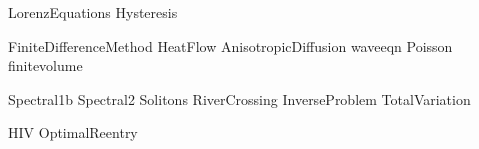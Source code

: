 \documentclass[nociteref]{SIAM-GH-book}
\begin{document}
{LorenzEquations}
{Hysteresis}

{FiniteDifferenceMethod}
{HeatFlow}
{AnisotropicDiffusion}
{waveeqn}
{Poisson}
{finitevolume}


{Spectral1b}
{Spectral2}
{Solitons}
{RiverCrossing}
{InverseProblem}
{TotalVariation}

{HIV} 
{OptimalReentry} 
\end{document}

